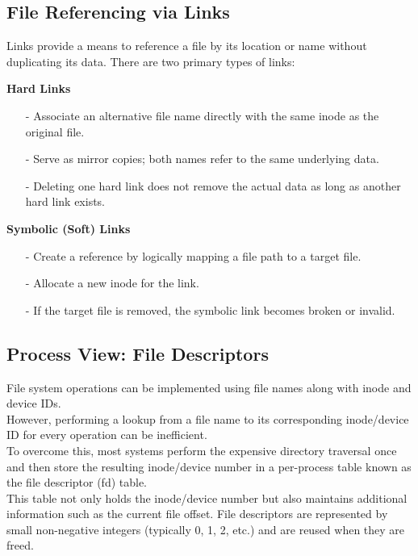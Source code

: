 \documentclass[../../compsys.tex]{subfiles}
\begin{document}
\subsection{File Referencing via Links}
Links provide a means to reference a file by its location or name without duplicating its data. There are two primary types of links:

\begin{description}
  \item\textbf{Hard Links}
    \begin{itemize}
      \item[-] Associate an alternative file name directly with the same inode as the original file.
      \item[-] Serve as mirror copies; both names refer to the same underlying data.
      \item[-] Deleting one hard link does not remove the actual data as long as another hard link exists.
    \end{itemize}
    
  \item\textbf{Symbolic (Soft) Links}
    \begin{itemize}
      \item[-] Create a reference by logically mapping a file path to a target file.
      \item[-] Allocate a new inode for the link.
      \item[-] If the target file is removed, the symbolic link becomes broken or invalid.
    \end{itemize}
\end{description}

\subsection{Process View: File Descriptors}
File system operations can be implemented using file names along with inode and device IDs.\\ However, performing a lookup from a file name to its corresponding inode/device ID for every operation can be inefficient.\\
To overcome this, most systems perform the expensive directory traversal once and then store the resulting inode/device number in a per-process table known as the file descriptor (fd) table. \\

This table not only holds the inode/device number but also maintains additional information such as the current file offset. File descriptors are represented by small non-negative integers (typically 0, 1, 2, etc.) and are reused when they are freed.
\end{document}
